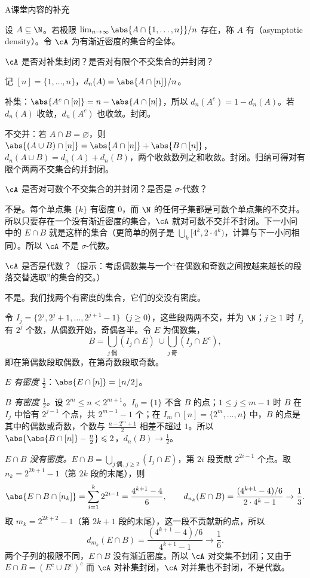 \begin{exercises}{A}{课堂内容的补充}
\item\label{ex:set-systems:A6} 设 $A\subseteq\N$。若极限 $\lim_{n\to\infty}\abs{A\cap\{1,\dots,n\}}/n$ 存在，称 $A$ 有（asymptotic density）。令 $\cA$ 为有渐近密度的集合的全体。
\begin{questions}
\item $\cA$ 是否对补集封闭？是否对有限个不交集合的并封闭？
\begin{solution}
记 $[n]=\{1,\dots,n\}$，$d_n(A)=\abs{A\cap[n]}/n$。

补集：$\abs{A^c\cap[n]}=n-\abs{A\cap[n]}$，所以 $d_n(A^c)=1-d_n(A)$。若 $d_n(A)$ 收敛，$d_n(A^c)$ 也收敛。封闭。

不交并：若 $A\cap B=\varnothing$，则 $\abs{(A\cup B)\cap[n]}=\abs{A\cap[n]}+\abs{B\cap[n]}$，$d_n(A\cup B)=d_n(A)+d_n(B)$，两个收敛数列之和收敛。封闭。归纳可得对有限个两两不交集合的并封闭。
\end{solution}
\item $\cA$ 是否对可数个不交集合的并封闭？是否是 $\sigma$-代数？
\begin{solution}
不是。每个单点集 $\{k\}$ 有密度 $0$，而 $\N$ 的任何子集都是可数个单点集的不交并。所以只要存在一个没有渐近密度的集合，$\cA$ 就对可数不交并不封闭。下一小问中的 $E\cap B$ 就是这样的集合（更简单的例子是 $\bigcup_k[4^k,2\cdot4^k)$，计算与下一小问相同）。所以 $\cA$ 不是 $\sigma$-代数。
\end{solution}
\item $\cA$ 是否是代数？（提示：考虑偶数集与一个“在偶数和奇数之间按越来越长的段落交替选取”的集合的交。）
\begin{solution}
不是。我们找两个有密度的集合，它们的交没有密度。

令 $I_j=\{2^j,2^j+1,\dots,2^{j+1}-1\}$（$j\geqslant0$），这些段两两不交，并为 $\N$；$j\geqslant1$ 时 $I_j$ 有 $2^j$ 个数，从偶数开始，奇偶各半。令 $E$ 为偶数集，
\[
B=\bigcup_{j\ \text{偶}}(I_j\cap E)\ \cup\bigcup_{j\ \text{奇}}(I_j\cap E^c),
\]
即在第偶数段取偶数，在第奇数段取奇数。

\emph{$E$ 有密度 $\frac12$}：$\abs{E\cap[n]}=\lfloor n/2\rfloor$。

\emph{$B$ 有密度 $\frac12$。}设 $2^m\leqslant n<2^{m+1}$。$I_0=\{1\}$ 不含 $B$ 的点；$1\leqslant j\leqslant m-1$ 时 $B$ 在 $I_j$ 中恰有 $2^{j-1}$ 个点，共 $2^{m-1}-1$ 个；在 $I_m\cap[n]=\{2^m,\dots,n\}$ 中，$B$ 的点是其中的偶数或奇数，个数与 $\frac{n-2^m+1}2$ 相差不超过 $1$。所以 $\abs{\abs{B\cap[n]}-\frac n2}\leqslant2$，$d_n(B)\to\frac12$。

\emph{$E\cap B$ 没有密度。}$E\cap B=\bigcup_{j\ \text{偶},\,j\geqslant2}(I_j\cap E)$，第 $2i$ 段贡献 $2^{2i-1}$ 个点。取 $n_k=2^{2k+1}-1$（第 $2k$ 段的末尾），则
\[
\abs{E\cap B\cap[n_k]}=\sum_{i=1}^k2^{2i-1}=\frac{4^{k+1}-4}6,\qquad d_{n_k}(E\cap B)=\frac{(4^{k+1}-4)/6}{2\cdot4^k-1}\to\frac13 .
\]
取 $m_k=2^{2k+2}-1$（第 $2k+1$ 段的末尾），这一段不贡献新的点，所以
\[
d_{m_k}(E\cap B)=\frac{(4^{k+1}-4)/6}{4^{k+1}-1}\to\frac16 .
\]
两个子列的极限不同，$E\cap B$ 没有渐近密度。所以 $\cA$ 对交集不封闭；又由于 $E\cap B=(E^c\cup B^c)^c$ 而 $\cA$ 对补集封闭，$\cA$ 对并集也不封闭，不是代数。


\end{solution}
\end{questions}
\end{exercises}
